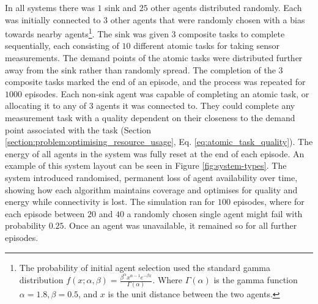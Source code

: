 In all systems there was  $1$ sink and $25$ other agents distributed randomly. Each was initially connected to $3$ other agents that were randomly chosen with a bias towards nearby agents\footnote{The probability of initial agent selection used the standard gamma distribution $f(x; \alpha, \beta) = \frac{\beta^{\alpha} x^{\alpha-1}e^{- \beta x}}   {\Gamma(\alpha)}$. Where  $\Gamma(\alpha)$ is the  gamma function $\alpha=1.8, \beta=0.5$, and $x$ is the unit distance between the two agents.}. 
The sink was given $3$ composite tasks to complete sequentially, each consisting of $10$ different atomic tasks for taking sensor measurements. The demand points of the atomic tasks were distributed further away from the sink rather than randomly spread. The completion of the $3$ composite tasks marked the end of an episode, and the process was repeated for $1000$ episodes. Each non-sink agent was capable of completing an atomic task, or allocating it to any of $3$ agents it was connected to. They could complete any measurement task with a quality dependent on their closeness to the demand point associated with the task (Section \ref{section:problem:optimising_resource_usage}, Eq. \ref{eq:atomic_task_quality}). The energy of all agents in the system was fully reset at the end of each episode. An example of this system layout can be seen in Figure \ref{fig:system-types}.  The \simulationNodeFailure{}{} system introduced randomised, permanent loss of agent availability over time, showing how each algorithm maintains coverage and optimises for quality and energy while connectivity is lost. The simulation ran for $100$ episodes, where for each episode between $20$ and $40$  a randomly chosen single agent might fail with probability $0.25$. Once an agent was unavailable, it remained so for all further episodes. 

 
